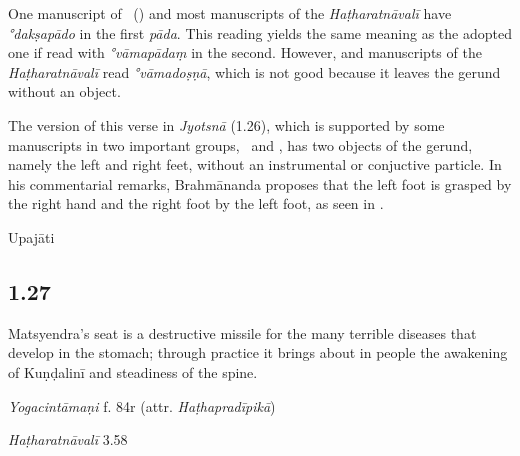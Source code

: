 \begin{ekdosis}
\begin{philcomm}[hp01_026]
One manuscript of \textalpha\ () and most manuscripts of the \textit{Haṭharatnāvalī} have \emph{°dakṣapādo} in the first \emph{pāda}. This reading yields the same meaning as the adopted one if read with \emph{°vāmapādaṃ} in the second. However,  and manuscripts of the \textit{Haṭharatnāvalī} read \emph{°vāmadoṣṇā}, which is not good because it leaves the gerund without an object.

The version of this verse in \emph{Jyotsnā} (1.26), which is supported by some manuscripts in two important groups, \textbeta\ and \texteta, has two objects of the gerund, namely the left and right feet, without an instrumental or conjuctive particle. In his commentarial remarks, Brahmānanda proposes that the left foot is grasped by the right hand and the right foot by the left foot, as seen in .
\end{philcomm}

\begin{metre}[hp01_026]
Upajāti
\end{metre}

\subsection*{1.27}
\begin{translation}[hp01_027]
Matsyendra's seat is a destructive missile for the many terrible diseases that develop in the stomach; through practice it brings about in people the awakening of Kuṇḍalinī and steadiness of the spine.
\end{translation}

\begin{testimonia}[hp01_027]
\emph{Yogacintāmaṇi} f. 84r (attr. \emph{Haṭhapradīpikā})

\begin{versinnote}
\tl{\var{°pravṛddha ] N : °pravṛddhiṃ L}\\!}
\end{versinnote}

\emph{Haṭharatnāvalī} 3.58

\begin{versinnote}
\tl{\var{°pradīptaṃ ] pravṛttaṃ T,t1 °pravṛttaḥ N,n1,n3,J}\\!}
\end{versinnote}


\end{testimonia}
\end{ekdosis}
